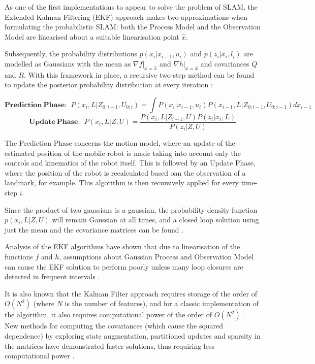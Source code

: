 \documentclass[12pt]{article}
\begin{document}
As one of the first implementations to appear to solve the problem of SLAM, the Extended Kalman Filtering (EKF) approach makes two approximations when formulating the probabilistic SLAM: both the Process Model and the Observation Model are linearised about a suitable linearisation point $\hat{x}$.

 Subsequently, the probability distributions $p(x_i|x_{i-1}, u_i)$ and $p(z_i|x_i, l_i)$ are modelled as Gaussians with the mean as $\nabla f|_{x=\hat{x}}$ and $\nabla h|_{x=\hat{x}}$ and covariances $Q$ and $R$. With this framework in place, a recursive two-step method can be found to update the posterior probability distribution at every iteration \cite{SLAMPartI}:

\begin{equation*}
\mathbf{Prediction\ Phase:}\ \ 
P(x_{i},L|Z_{0:i-1}, U_{0:i}) = \int P(x_i | x_{i-1}, u_{i}) P(x_{i-1}, L |Z_{0:i-1}, U_{0:i-1})dx_{i-1}
\end{equation*}
\begin{equation*}
\mathbf{Update\ Phase:} \ \  P(x_i, L | Z, U) = \frac{P(x_{i}, L | Z_{i-1}, U)P(z_i|x_i,L)}{P(z_i|Z, U)}
\end{equation*}	 	

The Prediction Phase concerns the motion model, where an update of the estimated position of the mobile robot is made taking into account only the controls and kinematics of the robot itself. This is followed by an Update Phase, where the position of the robot is recalculated based oan the observation of a landmark, for example. This algorithm is then recursively applied for every time-step $i$. 	

Since the product of two gaussians is a gaussian, the probability density function $p(x_i, L|Z, U)$ will remain Gaussian at all times, and a closed loop solution using just the mean and the covariance matrices can be found \cite{772544}.

Analysis of the EKF algorithms have shown that due to linearisation of the functions $f$ and $h$, assumptions about Gaussian Process and Observation Model can cause the EKF solution to perform poorly unless many loop closures are detected in frequent intervals \cite{doi:10.1177/1729881416669482}.

It is also known that the Kalman Filter approach requires storage of the order of $O(N^2)$ (where $N$ is the number of features), and for a classic implementation of the algorithm, it also requires computational power of the order of $O(N^2)$ \cite{CsorbaThesis}. New methods for computing the covariances (which cause the squared dependence) by exploring state augmentation, partitioned updates and sparsity in the matrices have demonstrated faster solutions, thus requiring less computational power \cite{SLAMPartII}.
\end{document}
